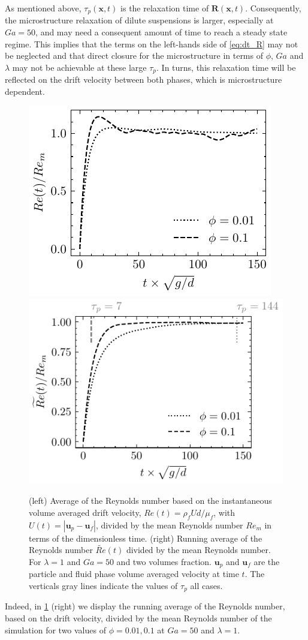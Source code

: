 As mentioned above, $\tau_p(\textbf{x},t)$ is the relaxation time of $\textbf{R}(\textbf{x},t)$. 
Consequently, the microstructure relaxation of dilute suspensions is larger, especially at $Ga = 50$, and may need a consequent amount of time to reach a steady state regime. 
This implies that the terms on the left-hands side of \ref{eq:dt_R} may not be neglected and that direct closure for the microstructure in terms of $\phi$, $Ga$ and $\lambda$ may not be achievable at these large $\tau_p$. 
In turns, this relaxation time will be reflected on the drift velocity between both phases, which is microstructure dependent. 
\begin{figure}
    \centering
    \includegraphics[height=0.325\textwidth]{image/HOMOGENEOUS_NEW/CA/Relax2.pdf}
    \includegraphics[height=0.35\textwidth]{image/HOMOGENEOUS_NEW/CA/Relax.pdf}
    \caption{
        (left) Average of the Reynolds number based on the instantaneous volume averaged drift velocity, $Re(t) = \rho_fU d /\mu_f$, with $U(t) = |\textbf{u}_p - \textbf{u}_f|$, divided by the mean Reynolds number $Re_m$ in terms of the dimensionless time. 
        (right) Running average of the Reynolds number $\widetilde{Re}(t)$ divided by the mean Reynolds number.
        For $\lambda = 1$ and $Ga = 50$ and two volumes fraction. 
        $\textbf{u}_p$ and $\textbf{u}_f$ are the particle and fluid phase volume averaged velocity at time $t$.
        The verticals gray lines indicate the values of $\tau_p$ all cases. 
        }
        \label{fig:relax}
\end{figure}
Indeed, in \ref{fig:relax} (right) we display the running average of the Reynolds number, based on the drift velocity, divided by the mean Reynolds number of the simulation for two values of $\phi = 0.01,0.1$ at $Ga = 50$ and $\lambda =1$. 

